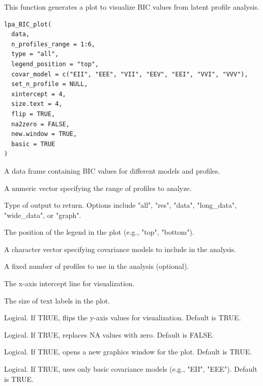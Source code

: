 \documentclass[a4paper]{book}
\begin{document}
%
\begin{Description}
This function generates a plot to visualize BIC values from latent profile analysis.
\end{Description}
%
\begin{Usage}
\begin{verbatim}
lpa_BIC_plot(
  data,
  n_profiles_range = 1:6,
  type = "all",
  legend_position = "top",
  covar_model = c("EII", "EEE", "VII", "EEV", "EEI", "VVI", "VVV"),
  set_n_profile = NULL,
  xintercept = 4,
  size.text = 4,
  flip = TRUE,
  na2zero = FALSE,
  new.window = TRUE,
  basic = TRUE
)
\end{verbatim}
\end{Usage}
%
\begin{Arguments}
\begin{ldescription}
\item[\code{data}] A data frame containing BIC values for different models and profiles.

\item[\code{n\_profiles\_range}] A numeric vector specifying the range of profiles to analyze.

\item[\code{type}] Type of output to return. Options include "all", "res", "data", "long\_data", "wide\_data", or "graph".

\item[\code{legend\_position}] The position of the legend in the plot (e.g., "top", "bottom").

\item[\code{covar\_model}] A character vector specifying covariance models to include in the analysis.

\item[\code{set\_n\_profile}] A fixed number of profiles to use in the analysis (optional).

\item[\code{xintercept}] The x-axis intercept line for visualization.

\item[\code{size.text}] The size of text labels in the plot.

\item[\code{flip}] Logical. If TRUE, flips the y-axis values for visualization. Default is TRUE.

\item[\code{na2zero}] Logical. If TRUE, replaces NA values with zero. Default is FALSE.

\item[\code{new.window}] Logical. If TRUE, opens a new graphics window for the plot. Default is TRUE.

\item[\code{basic}] Logical. If TRUE, uses only basic covariance models (e.g., "EII", "EEE"). Default is TRUE.
\end{ldescription}
\end{Arguments}
\end{document}
